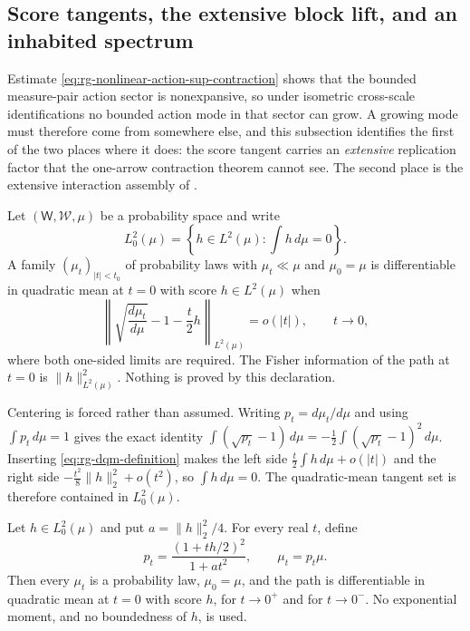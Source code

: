 \subsection{Score tangents, the extensive block lift, and an inhabited spectrum}
\label{sec:rg-score-lift}

Estimate \eqref{eq:rg-nonlinear-action-sup-contraction} shows that the bounded
measure-pair action sector is nonexpansive, so under isometric cross-scale
identifications no bounded action mode in that sector can grow.  A growing mode
must therefore come from somewhere else, and this subsection identifies the
first of the two places where it does: the score tangent carries an
\emph{extensive} replication factor that the one-arrow contraction theorem
cannot see.  The second place is the extensive interaction assembly of
.

Let \((\mathsf W,\mathscr W,\mu)\) be a probability space and write
\begin{equation}
 L^2_0(\mu)
 =\left\{h\in L^2(\mu):\int h\,d\mu=0\right\}.
 \label{eq:rg-centered-tangent}
\end{equation}
A family \((\mu_t)_{\lvert t\rvert<t_0}\) of probability laws with
\(\mu_t\ll\mu\) and \(\mu_0=\mu\) is differentiable in quadratic mean at
\(t=0\) with score \(h\in L^2(\mu)\) when
\begin{equation}
 \left\lVert
 \sqrt{\frac{d\mu_t}{d\mu}}-1-\frac t2h
 \right\rVert_{L^2(\mu)}
 =o(\lvert t\rvert),
 \qquad t\to0,
 \label{eq:rg-dqm-definition}
\end{equation}
where both one-sided limits are required.  The Fisher information of the path
at \(t=0\) is \(\lVert h\rVert_{L^2(\mu)}^2\).  Nothing is proved by this
declaration. 

Centering is forced rather than assumed.  Writing \(p_t=d\mu_t/d\mu\) and using
\(\int p_t\,d\mu=1\) gives the exact identity
\(\int(\sqrt{p_t}-1)\,d\mu=-\tfrac12\int(\sqrt{p_t}-1)^2\,d\mu\).  Inserting
\eqref{eq:rg-dqm-definition} makes the left side
\(\tfrac t2\int h\,d\mu+o(\lvert t\rvert)\) and the right side
\(-\tfrac{t^2}8\lVert h\rVert_2^2+o(t^2)\), so \(\int h\,d\mu=0\).  The
quadratic-mean tangent set is therefore contained in \(L^2_0(\mu)\).

Let \(h\in L^2_0(\mu)\) and put \(a=\lVert h\rVert_2^2/4\).  For every real
\(t\), define
\begin{equation}
 p_t=\frac{(1+th/2)^2}{1+at^2},
 \qquad
 \mu_t=p_t\mu.
 \label{eq:rg-quadratic-score-path}
\end{equation}
Then every \(\mu_t\) is a probability law, \(\mu_0=\mu\), and the path is
differentiable in quadratic mean at \(t=0\) with score \(h\), for
\(t\to0^+\) and for \(t\to0^-\).  No exponential moment, and no boundedness of
\(h\), is used. 

